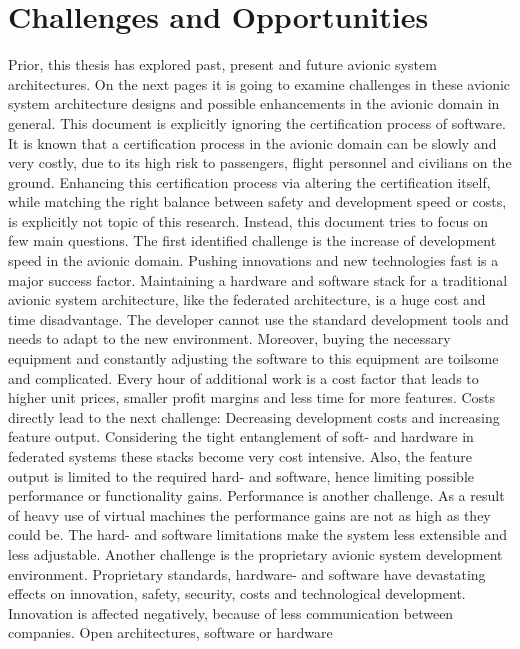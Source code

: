 \documentclass[titlepage]{report}
\begin{document}
\section{Challenges and Opportunities}\label{section:Challenges_And_Opportunities}
Prior, this thesis has explored past, present and future avionic system architectures. On the next pages it is going to examine
challenges in these avionic system architecture designs and possible enhancements in the avionic domain in general. This document is explicitly ignoring the certification
process of software. It is known that a certification process in the avionic domain can be slowly and very costly, due to its
high risk to passengers, flight personnel and civilians on the ground. Enhancing this certification process via altering the certification itself, while matching the right balance between safety
and development speed or costs, is explicitly not topic of this research. Instead, this document tries to focus on few main questions.
The first identified challenge is the increase of development speed in the avionic domain. Pushing innovations and new technologies fast is a major
success factor. Maintaining a hardware and software stack for a traditional avionic system architecture, like the federated architecture, is a
huge cost and time disadvantage. The developer cannot use the standard development tools and needs to adapt to the new environment. Moreover,
buying the necessary equipment and constantly adjusting the software to this equipment are toilsome and complicated. Every hour of additional
work is a cost factor that leads to higher unit prices, smaller profit margins and less time for more features. Costs directly lead to the next
challenge: Decreasing development costs and increasing feature output. Considering the tight entanglement of soft- and hardware in federated systems
these stacks become very cost intensive. Also, the feature output is limited to the required hard- and software,
hence limiting possible performance or functionality gains. Performance is another challenge. As a result of heavy use of virtual machines the performance
gains are not as high as they could be. The hard- and software limitations make the system less extensible and less adjustable. Another challenge is the
proprietary avionic system development environment. Proprietary standards, hardware- and software have devastating effects on innovation, safety, security,
costs and technological development. Innovation is affected negatively, because of less communication between companies. Open architectures, software or hardware
\end{document}
